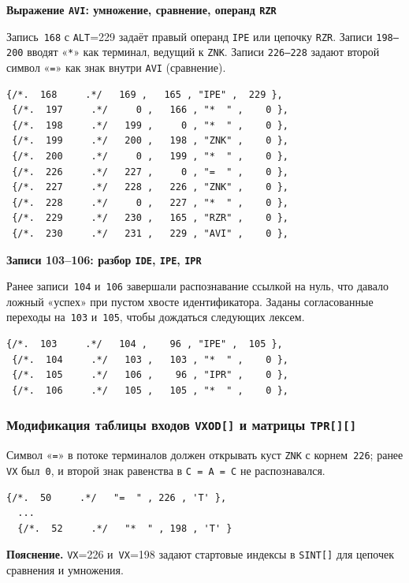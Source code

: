 \documentclass[a4paper,14pt]{extarticle}
\newcommand{\blocktitle}[1]{\par\needspace{4\baselineskip}\noindent\textbf{#1}\par\vspace{0.35\baselineskip}}
\begin{document}
\blocktitle{Выражение \texttt{AVI}: умножение, сравнение, операнд \texttt{RZR}}

Запись~\texttt{168} с \texttt{ALT}=229 задаёт правый операнд \texttt{IPE} или
цепочку \texttt{RZR}. Записи \texttt{198--200} вводят «\texttt{*}» как терминал,
ведущий к \texttt{ZNK}. Записи \texttt{226--228} задают второй символ «\texttt{=}»
как знак внутри \texttt{AVI} (сравнение).

\begin{lstlisting}[style=Cstyle,caption={Фрагмент разбора \texttt{AVI}},label=lst:sint_avi]
 {/*.  168     .*/   169 ,   165 , "IPE" ,  229 },
 {/*.  197     .*/     0 ,   166 , "*  " ,    0 },
 {/*.  198     .*/   199 ,     0 , "*  " ,    0 },
 {/*.  199     .*/   200 ,   198 , "ZNK" ,    0 },
 {/*.  200     .*/     0 ,   199 , "*  " ,    0 },
 {/*.  226     .*/   227 ,     0 , "=  " ,    0 },
 {/*.  227     .*/   228 ,   226 , "ZNK" ,    0 },
 {/*.  228     .*/     0 ,   227 , "*  " ,    0 },
 {/*.  229     .*/   230 ,   165 , "RZR" ,    0 },
 {/*.  230     .*/   231 ,   229 , "AVI" ,    0 },
\end{lstlisting}

\blocktitle{Записи 103--106: разбор \texttt{IDE}, \texttt{IPE}, \texttt{IPR}}

Ранее записи~\texttt{104} и~\texttt{106} завершали распознавание ссылкой на нуль,
что давало ложный «успех» при пустом хвосте идентификатора. Заданы согласованные
переходы на~\texttt{103} и~\texttt{105}, чтобы дождаться следующих лексем.

\begin{lstlisting}[style=Cstyle,caption={Записи 103--106},label=lst:sint_ide]
 {/*.  103     .*/   104 ,    96 , "IPE" ,  105 },
 {/*.  104     .*/   103 ,   103 , "*  " ,    0 },
 {/*.  105     .*/   106 ,    96 , "IPR" ,    0 },
 {/*.  106     .*/   105 ,   105 , "*  " ,    0 },
\end{lstlisting}

\subsubsection*{Модификация таблицы входов \texttt{VXOD[]} и матрицы \texttt{TPR[][]}}

Символ «\texttt{=}» в потоке терминалов должен открывать куст \texttt{ZNK} с
корнем~\texttt{226}; ранее \texttt{VX} был~\texttt{0}, и второй знак равенства в
\texttt{C = A = C} не распознавался.

\begin{lstlisting}[style=Cstyle,caption={Таблица \texttt{VXOD[]}: входы для «\texttt{=}» и «\texttt{*}»},label=lst:vxod]
  {/*.  50     .*/   "=  " , 226 , 'T' },
  ...
  {/*.  52     .*/   "*  " , 198 , 'T' }
\end{lstlisting}
\textbf{Пояснение.} \texttt{VX}=226 и~\texttt{VX}=198 задают стартовые индексы в
\texttt{SINT[]} для цепочек сравнения и умножения.
\end{document}
